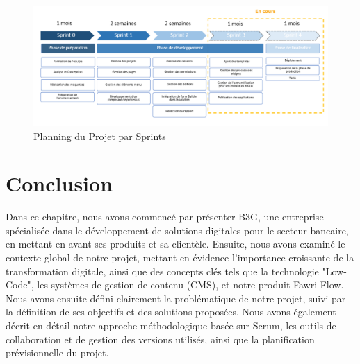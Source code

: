 \begin{figure}[H] 
    \centering
    \includegraphics[width=18cm]{Figures/sprints.PNG}
    \caption{Planning du Projet par Sprints}
\end{figure}



\newpage

\section*{Conclusion}

\hspace{\parindent}Dans ce chapitre, nous avons commencé par présenter B3G, une entreprise spécialisée dans le développement de solutions digitales pour le secteur bancaire, en mettant en avant ses produits et sa clientèle. Ensuite, nous avons examiné le contexte global de notre projet, mettant en évidence l'importance croissante de la transformation digitale, ainsi que des concepts clés tels que la technologie "Low-Code", les systèmes de gestion de contenu (CMS), et notre produit Fawri-Flow. Nous avons ensuite défini clairement la problématique de notre projet, suivi par la définition de ses objectifs et des solutions proposées. Nous avons également décrit en détail notre approche méthodologique basée sur Scrum, les outils de collaboration et de gestion des versions utilisés, ainsi que la planification prévisionnelle du projet.

